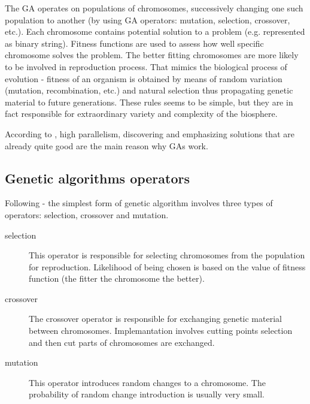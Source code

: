 The GA operates on populations of chromosomes, successively changing one such population to another (by using GA operators: mutation, selection, crossover, etc.). 
Each chromosome contains potential solution to a problem (e.g. represented as binary string). 
Fitness functions are used to assess how well specific chromosome solves the problem.
The better fitting chromosomes are more likely to be involved in reproduction process.
That mimics the biological process of evolution - fitness of an organism is obtained by means of random variation (mutation, recombination, etc.) and natural selection
thus propagating genetic material to future generations.
These rules seems to be simple, but they are in fact responsible for extraordinary variety and complexity of the biosphere.
\cite{Mitchell01} 
 
According to \cite{Mitchell01} , high parallelism, discovering and emphasizing solutions that are already quite good are the main reason why GAs work.  
 

\subsection{Genetic algorithms operators}

Following \cite{Mitchell01} - the simplest form of genetic algorithm involves three types of operators: selection, crossover and mutation. 

\begin{description}

\item[selection]
  This operator is responsible for selecting chromosomes from the population for reproduction.
  Likelihood of being chosen is based on the value of fitness function (the fitter the chromosome the better).
  
\item[crossover]
  The crossover operator is responsible for exchanging genetic material between chromosomes.
  Implemantation involves cutting points selection and then cut parts of chromosomes are exchanged.

\item[mutation]
  This operator introduces random changes to a chromosome.
  The probability of random change introduction is usually very small.  

\end{description}


